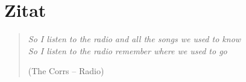 \chapter*{Zitat}
\label{cha:Zitat}

\thispagestyle{empty}

\begin{center}
\begin{minipage}{14cm}
\begin{verse}
\textit{So I listen to the radio and all the songs we used to know \\
So I listen to the radio remember where we used to go}

(The Corrs -- Radio)
\end{verse}
\end{minipage}
\end{center}
